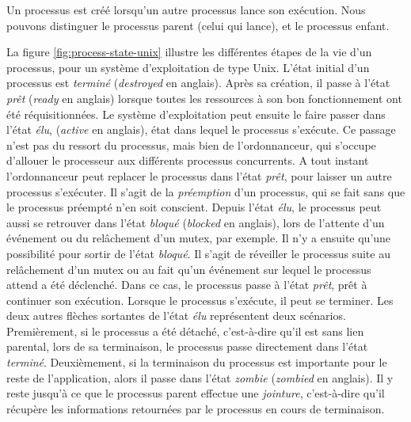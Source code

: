 Un processus est créé lorsqu'un autre processus lance son exécution. Nous pouvons distinguer le processus parent (celui qui lance), et le processus enfant.

La figure \ref{fig:process-state-unix} illustre les différentes étapes de la vie d'un processus, pour un système d'exploitation de type Unix. L'état initial d'un processus est \emph{terminé} (\emph{destroyed} en anglais). Après sa création, il passe à l'état \emph{prêt} (\emph{ready} en anglais) lorsque toutes les ressources à son bon fonctionnement ont été réquisitionnées.
Le système d'exploitation peut ensuite le faire passer dans l'état \emph{élu}, (\emph{active} en anglais), état dans lequel le processus s'exécute.
Ce passage n'est pas du ressort du processus, mais bien de l'ordonnanceur, qui s'occupe d'allouer le processeur aux différents processus concurrents. A tout instant l'ordonnanceur peut replacer le processus dans l'état \emph{prêt}, pour laisser un autre processus s'exécuter. Il s'agit de la \emph{préemption} d'un processus, qui se fait sans que le processus préempté n'en soit conscient. Depuis l'état \emph{élu}, le processus peut aussi se retrouver dans l'état \emph{bloqué} (\emph{blocked} en anglais), lors de l'attente d'un événement ou du relâchement d'un mutex, par exemple. Il n'y a ensuite qu'une possibilité pour sortir de l'état \emph{bloqué}. Il s'agit de réveiller le processus suite au relâchement d'un mutex ou au fait qu'un événement sur lequel le processus attend a été déclenché. Dans ce cas, le processus passe à l'état \emph{prêt}, prêt à continuer son exécution. Lorsque le processus s'exécute, il peut se terminer. Les deux autres flèches sortantes de l'état \emph{élu} représentent deux scénarios. Premièrement, si le processus a été détaché, c'est-à-dire qu'il est sans lien parental, lors de sa terminaison, le processus passe directement dans l'état \emph{terminé}. Deuxièmement, si la terminaison du processus est importante pour le reste de l'application, alors il passe dans l'état \emph{zombie} (\emph{zombied} en anglais). Il y reste jusqu'à ce que le processus parent effectue une \emph{jointure}, c'est-à-dire qu'il récupère les informations retournées par le processus en cours de terminaison.

